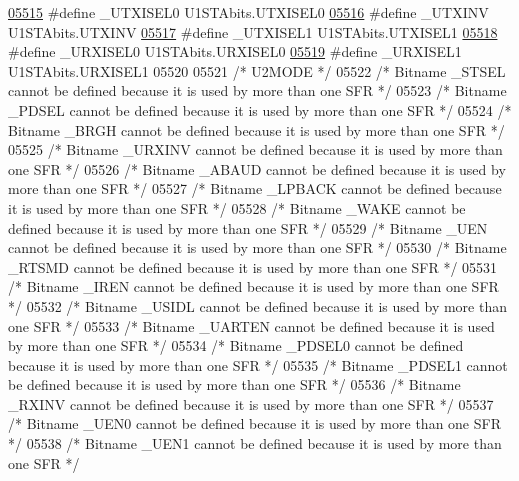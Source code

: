 \begin{DoxyCode}
\hypertarget{a00009_source_l05515}{}\hyperlink{a00009_a9d38dd91c66a8f4514a464fad2f65a85}{05515} \textcolor{preprocessor}{#define \_UTXISEL0 U1STAbits.UTXISEL0}
\hypertarget{a00009_source_l05516}{}\hyperlink{a00009_a3f14056df48953cc7f89998e40640758}{05516} \textcolor{preprocessor}{#define \_UTXINV U1STAbits.UTXINV}
\hypertarget{a00009_source_l05517}{}\hyperlink{a00009_ad8d65e38bef9dd4b92677b96bacafe61}{05517} \textcolor{preprocessor}{#define \_UTXISEL1 U1STAbits.UTXISEL1}
\hypertarget{a00009_source_l05518}{}\hyperlink{a00009_a24aae81f2c4406a8ce87b10991b11821}{05518} \textcolor{preprocessor}{#define \_URXISEL0 U1STAbits.URXISEL0}
\hypertarget{a00009_source_l05519}{}\hyperlink{a00009_af5ad1d270534c03075ab0471626063a1}{05519} \textcolor{preprocessor}{#define \_URXISEL1 U1STAbits.URXISEL1}
05520 
05521 \textcolor{comment}{/* U2MODE */}
05522 \textcolor{comment}{/* Bitname \_STSEL cannot be defined because it is used by more than one SFR */}
05523 \textcolor{comment}{/* Bitname \_PDSEL cannot be defined because it is used by more than one SFR */}
05524 \textcolor{comment}{/* Bitname \_BRGH cannot be defined because it is used by more than one SFR */}
05525 \textcolor{comment}{/* Bitname \_URXINV cannot be defined because it is used by more than one SFR */}
05526 \textcolor{comment}{/* Bitname \_ABAUD cannot be defined because it is used by more than one SFR */}
05527 \textcolor{comment}{/* Bitname \_LPBACK cannot be defined because it is used by more than one SFR */}
05528 \textcolor{comment}{/* Bitname \_WAKE cannot be defined because it is used by more than one SFR */}
05529 \textcolor{comment}{/* Bitname \_UEN cannot be defined because it is used by more than one SFR */}
05530 \textcolor{comment}{/* Bitname \_RTSMD cannot be defined because it is used by more than one SFR */}
05531 \textcolor{comment}{/* Bitname \_IREN cannot be defined because it is used by more than one SFR */}
05532 \textcolor{comment}{/* Bitname \_USIDL cannot be defined because it is used by more than one SFR */}
05533 \textcolor{comment}{/* Bitname \_UARTEN cannot be defined because it is used by more than one SFR */}
05534 \textcolor{comment}{/* Bitname \_PDSEL0 cannot be defined because it is used by more than one SFR */}
05535 \textcolor{comment}{/* Bitname \_PDSEL1 cannot be defined because it is used by more than one SFR */}
05536 \textcolor{comment}{/* Bitname \_RXINV cannot be defined because it is used by more than one SFR */}
05537 \textcolor{comment}{/* Bitname \_UEN0 cannot be defined because it is used by more than one SFR */}
05538 \textcolor{comment}{/* Bitname \_UEN1 cannot be defined because it is used by more than one SFR */}

\end{DoxyCode}
